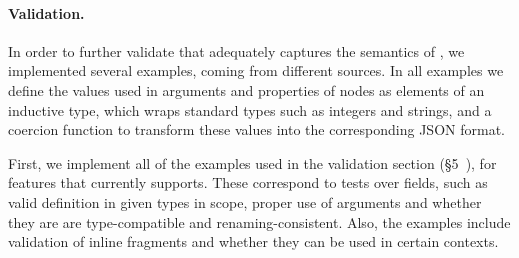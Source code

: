 



\paragraph{Validation.}

In order to further validate that \gcoql adequately captures the semantics of \gql, we implemented several examples, coming from different sources. 
In all examples we define the values used in arguments and properties of nodes as elements of an inductive type, which wraps standard \coq types such as integers and strings, 
and a coercion function to transform these values into the corresponding JSON format.


First, we implement all of the examples used in the \spec validation section (\cf\S5~\cite{gqlspec}), for features that \gcoql currently supports.
These correspond to tests over fields, such as valid definition in given types in scope, proper use of arguments and 
whether they are are type-compatible and renaming-consistent. Also, the examples include validation of inline fragments and 
whether they can be used in certain contexts. 


